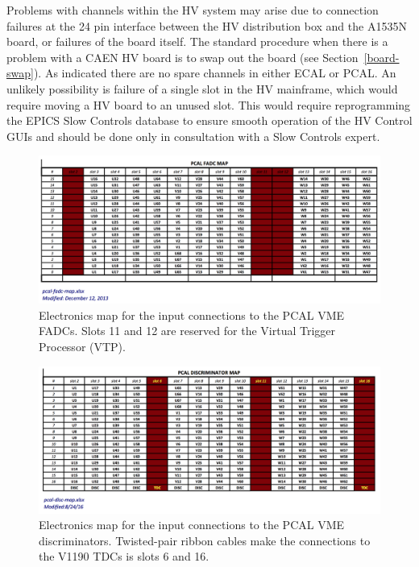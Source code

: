 \documentclass[letterpaper,10pt]{article}
\begin{document}
Problems with channels within the HV system may arise due to connection failures at the 24 pin
interface between the HV distribution box and the A1535N board, or failures of the board itself.
The standard procedure when there is a problem with a CAEN HV board is to swap out the board
(see Section~\ref{board-swap}).  As indicated there are no spare channels in either ECAL or PCAL.
An unlikely possibility is failure of a single slot in the HV mainframe, which would require
moving a HV board to an unused slot. This would require reprogramming the EPICS Slow Controls database
to ensure smooth operation of the HV Control GUIs and should be done only in consultation with a
Slow Controls expert. 


\begin{figure}
  \hspace{1cm}
  \includegraphics[width=9in]{pcal-fadc-map}
  \caption{Electronics map for the input connections to the PCAL VME FADCs.  Slots 11 and 12 are
  reserved for the Virtual Trigger Processor (VTP).}
  \label{pcal-fadc-map}
\end{figure}

\begin{figure}
  \hspace{1cm}
  \includegraphics[width=9in]{pcal-disc-map}
  \caption{Electronics map for the input connections to the PCAL VME discriminators. Twisted-pair ribbon
  cables make the connections to the V1190 TDCs is slots 6 and 16.}
  \label{pcal-disc-map}
\end{figure}
\end{document}
